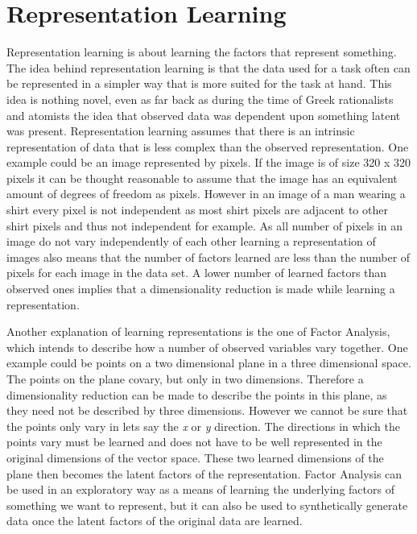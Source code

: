 \documentclass[a4paper,11pt]{kth-mag}
\begin{document}
\section{Representation Learning}
Representation learning is about learning the factors that represent something. The idea behind representation learning is that the data used for a task often can be represented in a simpler way that is more suited for the task at hand\cite{bengio2013representation}. This idea is nothing novel, even as far back as during the time of Greek rationalists and atomists the idea that observed data was dependent upon something latent was present\cite{mulaik1987brief}. Representation learning assumes that there is an intrinsic representation of data that is less complex than the observed representation. One example could be an image represented by pixels. If the image is of size 320 x 320 pixels it can be thought reasonable to assume that the image has an equivalent amount of degrees of freedom as pixels. However in an image of a man wearing a shirt every pixel is not independent as most shirt pixels are adjacent to other shirt pixels and thus not independent for example. As all number of pixels in an image do not vary independently of each other learning a representation of images also means that the number of factors learned are less than the number of pixels for each image in the data set. A lower number of learned factors than observed ones implies that a dimensionality reduction is made while learning a representation. 

Another explanation of learning representations is the one of Factor Analysis, which intends to describe how a number of observed variables vary together. One example could be points on a two dimensional plane in a three dimensional space. The points on the plane covary, but only in two dimensions. Therefore a dimensionality reduction can be made to describe the points in this plane, as they need not be described by three dimensions. However we cannot be sure that the points only vary in lets say the \textit{x} or \textit{y} direction. The directions in which the points vary must be learned and does not have to be well represented in the original dimensions of the vector space. These two learned dimensions of the plane then becomes the latent factors of the representation.
Factor Analysis can be used in an exploratory way as a means of learning the underlying factors of something we want to represent, but it can also be used to synthetically generate data once the latent factors of the original data are learned.
\end{document}
